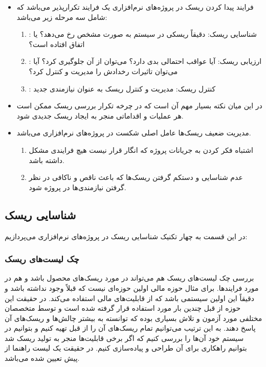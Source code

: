 \begin{itemize}
    \item فرایند پیدا کردن ریسک در پروژه‌های نرم‌افزاری یک فرایند تکرارپذیر
    می‌باشد که شامل سه مرحله‌ زیر می‌باشد: \begin{enumerate}
    \item {}: شناسایی ریسک: دقیقاً ریسکی در سیستم به صورت
    مشخص رخ می‌دهد؟ یا اتفاق افتاده است؟
    \item {}: ارزیابی ریسک: آیا عواقب احتمالی بدی دارد؟
    می‌توان از آن جلوگیری کرد؟ آیا می‌توان تاثیرات رخدادش را مدیریت و کنترل کرد؟
    \item {}: کنترل ریسک: مدیریت و کنترل ریسک به عنوان نیازمندی
    جدید
\end{enumerate}
    \item در این میان نکته بسیار مهم آن است که در چرخه تکرار بررسی ریسک ممکن است
    هر عملیات و اقداماتی منجر به ایجاد ریسک جدیدی شود.
    \item مدیریت ضعیف ریسک‌ها عامل اصلی شکست در پروژه‌های نرم‌افزاری می‌باشد.
    \begin{enumerate}
        \item اشتباه فکر کردن به جریانات پروژه که انگار قرار نیست هیچ فرایندی
        مشکل داشته باشد.
        \item عدم شناسایی و دستکم گرفتن ریسک‌ها که باعث ناقص و ناکافی در نظر
        گرفتن نیازمندی‌ها در پروژه شود.
    \end{enumerate}
\end{itemize}


\subsection{شناسایی ریسک}

در این قسمت به چهار تکنیک شناسایی ریسک در پروژه‌های نرم‌افزاری می‌پردازیم:

\subsubsection{چک لیست‌های ریسک}

بررسی چک لیست‌های ریسک هم می‌تواند در مورد ریسک‌های محصول باشد و هم در مورد
فرایند‌ها. برای مثال حوزه مالی اولین حوزه‌ای نیست که قبلاً وجود نداشته باشد و
دقیقاً این اولین سیستمی باشد که از قابلیت‌های مالی استفاده می‌کند. در حقیقت این
حوزه از قبل چندین بار مورد استفاده قرار گرفته شده است و توسط متخصصان مختلفی مورد
آزمون و تلاش بسیاری بوده که توانسته به بیشتر چالش‌ها و ریسک‌های آن پاسخ دهند. به
این ترتیب می‌توانیم تمام ریسک‌های آن را از قبل تهیه کنیم و بتوانیم در سیستم خود
آن‌ها را بررسی کنیم که اگر برخی قابلیت‌ها منجر به تولید ریسک شد بتوانیم راهکاری
برای آن طراحی و پیاده‌سازی کنیم. در حقیقت یک لیست راهنما از پیش تعیین شده
می‌باشد.

